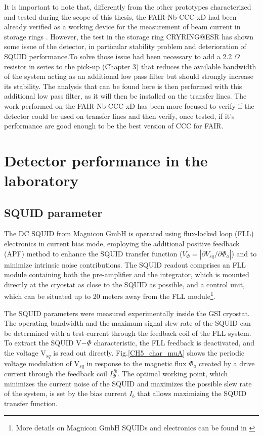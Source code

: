 \documentclass[12pt,a4paper]{report}
\begin{document}
       It is important to note that, differently from the other prototypes characterized and tested during the scope of this thesis, the FAIR-Nb-CCC-xD had been already verified as a working device for the measurement of beam current in storage rings \cite{DavidThesis}. However, the test in the storage ring CRYRING@ESR has shown some issue of the detector, in particular stability problem and deterioration of SQUID performance.To solve those issue had been necessary to add a 2.2 $\Omega$ resistor in series to the pick-up (Chapter 3) that reduces the available bandwidth of the system acting as an additional low pass filter but should strongly increase its stability. The analysis that can be found here is then performed with this additional low pass filter, as it will then be installed on the transfer lines. The work performed on the FAIR-Nb-CCC-xD has been more focused to verify if the detector could be used on transfer lines and then verify, once tested, if it's performance are good enough to be the best version of CCC for FAIR.
        \section{Detector performance in the laboratory}
        \subsection{SQUID parameter}
        The DC SQUID from Magnicon GmbH is operated using flux-locked loop (FLL) electronics in current bias mode, employing the additional positive feedback (APF) method to enhance the SQUID transfer function ($V_\Phi = |\partial V_{sq}/\partial\Phi_a|$) and to minimize intrinsic noise contributions. The SQUID readout comprises an FLL module containing both the pre-amplifier and the integrator, which is mounted directly at the cryostat as close to the SQUID as possible, and a control unit, which can be situated up to 20 meters away from the FLL module\footnote{More details on Magnicon GmbH SQUIDs and electronics can be found in \cite{Drung2007} \cite{Drung2009}}.
        
        The SQUID parameters were measured experimentally inside the GSI cryostat. The operating bandwidth and the maximum signal slew rate of the SQUID can be determined with a test current through the feedback coil of the FLL system. To extract the SQUID V$-\Phi$ characteristic, the FLL feedback is deactivated, and the voltage V$_{sq}$ is read out directly. Fig.\ref{CH5_char_muA} shows the periodic voltage modulation of V$_{sq}$ in response to the magnetic flux $\Phi_a$ created by a drive current through the feedback coil $I_\Phi^{fb}$. The optimal working point, which minimizes the current noise of the SQUID and maximizes the possible slew rate of the system, is set by the bias current $I_b$ that allows maximizing the SQUID transfer function.
        
\end{document}
